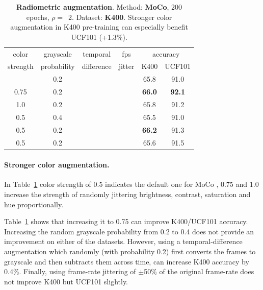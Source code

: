 \documentclass[final]{cvpr}
\newcommand{\tblref}[1]{Table~\ref{#1}}
\newcommand{\tablestyle}[2]{\setlength{\tabcolsep}{#1}\renewcommand{\arraystretch}{#2}\centering\footnotesize}
\begin{document}
	\begin{table}[h!] 
		\centering
		\tablestyle{3pt}{1.05} 
		\tablestyle{6.4pt}{1.0}	
		\begin{tabular}{cccccc}
			
			\multicolumn{1}{c}{color } & grayscale & temporal & fps & \multicolumn{2}{c}{accuracy}  \\
			strength & probability &  difference & jitter & K400 & UCF101  \\
			\shline
			0.5    & 0.2  &  &  & 65.8 &  91.0  \\ \hline
			0.75    & 0.2  &  &   & \textbf{66.0} &  \textbf{92.1}  \\
			1.0   & 0.2  &  &   & 65.8 &  91.2  \\ \hline 
			0.5    & 0.4  &  &  & 65.5 &  91.0  \\ \hline
			0.5    & 0.2  & \checkmark &  & \textbf{66.2} &  91.3 \\
			0.5    & 0.2  &  & \checkmark & 65.6 & 91.5  \\
		\end{tabular}
		\vspace{.3em}
		\caption{\textbf{Radiometric augmentation}. Method: \textbf{MoCo}, 200 epochs, $\rho=$~2. Dataset: \textbf{K400}. Stronger color augmentation in K400 pre-training can especially benefit UCF101 (+1.3\%).} \vspace{-5pt}
		\label{tab:color_aug}
	\end{table}
		
	\paragraph{Stronger color augmentation.}
	In  \tblref{tab:color_aug} color strength of 0.5 indicates the default one for MoCo \cite{Chen20moco}, 0.75 and 1.0 increase the strength of randomly jittering brightness, contrast, saturation and hue proportionally. %
	
	\tblref{tab:color_aug}  shows that increasing it to 0.75 can improve K400/UCF101 accuracy. Increasing the random grayscale probability from 0.2 to 0.4 does not provide an improvement on either of the datasets. However, using a temporal-difference augmentation which randomly (with probability 0.2) first converts the frames to grayscale and then subtracts them across time, can increase K400 accuracy by 0.4\%. Finally, using frame-rate jittering of $\pm$50\% of the original frame-rate does not improve K400 but UCF101 slightly.
	
\end{document}
